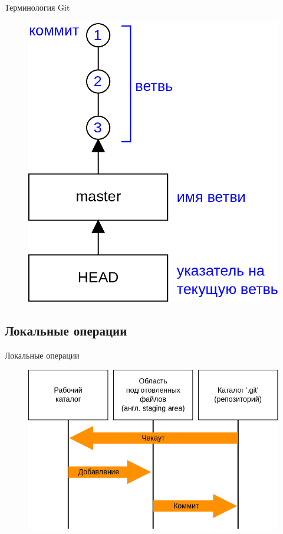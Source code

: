 \documentclass[presentation]{beamer}
\begin{document}
\begin{frame}{Терминология Git}
  \begin{figure}[htb]
    \centering
    \includegraphics[height=.9\textheight]{git-basics-0}
  \end{figure}
\end{frame}

\subsection{Локальные операции}

\begin{frame}{Локальные операции}
  \begin{figure}[htb]
    \centering
    \includegraphics[width=1\textwidth]{git-local-operations}
  \end{figure}
\end{frame}
\end{document}

